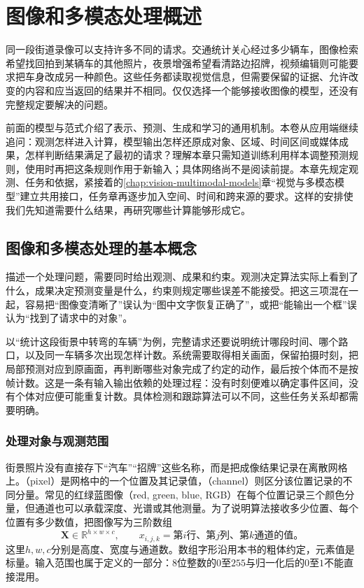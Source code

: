 \chapter{图像和多模态处理概述}
\label{chap:vision-overview}

同一段街道录像可以支持许多不同的请求。交通统计关心经过多少辆车，图像检索希望找回拍到某辆车的其他照片，夜景增强希望看清路边招牌，视频编辑则可能要求把车身改成另一种颜色。这些任务都读取视觉信息，但需要保留的证据、允许改变的内容和应当返回的结果并不相同。仅仅选择一个能够接收图像的模型，还没有完整规定要解决的问题。

前面的模型与范式介绍了表示、预测、生成和学习的通用机制。本卷从应用端继续追问：观测怎样进入计算，模型输出怎样还原成对象、区域、时间区间或媒体成果，怎样判断结果满足了最初的请求？理解本章只需知道训练利用样本调整预测规则，使用时再把这条规则作用于新输入；具体网络尚不是阅读前提。本章先规定观测、任务和依据，紧接着的\ref{chap:vision-multimodal-models}章“视觉与多模态模型”建立共用接口，任务章再逐步加入空间、时间和跨来源的要求。这样的安排使我们先知道需要什么结果，再研究哪些计算能够形成它。

\section{图像和多模态处理的基本概念}
\label{sec:vision-overview-concepts}

描述一个处理问题，需要同时给出观测、成果和约束。观测决定算法实际上看到了什么，成果决定预测变量是什么，约束则规定哪些误差不能接受。把这三项混在一起，容易把“图像变清晰了”误认为“图中文字恢复正确了”，或把“能输出一个框”误认为“找到了请求中的对象”。

以“统计这段街景中转弯的车辆”为例，完整请求还要说明统计哪段时间、哪个路口，以及同一车辆多次出现怎样计数。系统需要取得相关画面，保留拍摄时刻，把局部预测对应到原画面，再判断哪些对象完成了约定的动作，最后按个体而不是按帧计数。这是一条有输入输出依赖的处理过程：没有时刻便难以确定事件区间，没有个体对应便可能重复计数。具体检测和跟踪算法可以不同，这些任务关系却都需要明确。

\subsection{处理对象与观测范围}
\label{sec:vision-overview-observations}

街景照片没有直接存下“汽车”“招牌”这些名称，而是把成像结果记录在离散网格上。（pixel）是网格中的一个位置及其记录值，（channel）则区分该位置记录的不同分量。常见的红绿蓝图像（red, green, blue, RGB）在每个位置记录三个颜色分量，但通道也可以承载深度、光谱或其他测量。为了说明算法接收多少位置、每个位置有多少数值，把图像写为三阶数组
\begin{equation}
  \bm{X}\in\mathbb{R}^{h\times w\times c},
  \qquad x_{i,j,k}=\text{第$i$行、第$j$列、第$k$通道的值。}
  \label{eq:vision-image-array}
\end{equation}
这里$h,w,c$分别是高度、宽度与通道数。数组字形沿用本书的粗体约定，元素值是标量。输入范围也属于定义的一部分：8位整数的$0$至$255$与归一化后的$0$至$1$不能直接混用。

